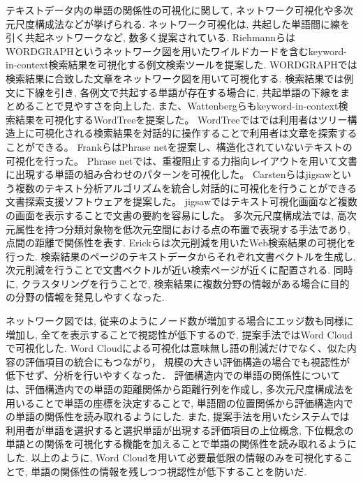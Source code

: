 \documentclass[syuuron]{kuee}
\begin{document}
		テキストデータ内の単語の関係性の可視化に関して, ネットワーク可視化や多次元尺度構成法などが挙げられる. 
		ネットワーク可視化は, 共起した単語間に線を引く共起ネットワークなど, 数多く提案されている. 
		RiehmannらはWORDGRAPHというネットワーク図を用いたワイルドカードを含むkeyword-in-context検索結果を可視化する例文検索ツールを提案した\cite{wg1}. 
		WORDGRAPHでは検索結果に合致した文章をネットワーク図を用いて可視化する. 
		検索結果では例文に下線を引き, 各例文で共起する単語が存在する場合に, 共起単語の下線をまとめることで見やすさを向上した. 
		また、Wattenbergらもkeyword-in-context検索結果を可視化するWordTreeを提案した\cite{wt1}。
		WordTreeではでは利用者はツリー構造上に可視化される検索結果を対話的に操作することで利用者は文章を探索することができる。
		FrankらはPhrase netを提案し、構造化されていないテキストの可視化を行った\cite{pn1}。
		Phrase netでは、重複阻止する力指向レイアウトを用いて文書に出現する単語の組み合わせのパターンを可視化した。
		Carstenらはjigsawという複数のテキスト分析アルゴリズムを統合し対話的に可視化を行うことができる文書探索支援ソフトウェアを提案した\cite{jig1}。
		jigsawではテキスト可視化画面など複数の画面を表示することで文書の要約を容易にした。
		多次元尺度構成法では, 高次元属性を持つ分類対象物を低次元空間における点の布置で表現する手法であり, 点間の距離で関係性を表す. 
		Erickらは次元削減を用いたWeb検索結果の可視化を行った\cite{or1}. 
		検索結果のページのテキストデータからそれぞれ文書ベクトルを生成し, 次元削減を行うことで文書ベクトルが近い検索ページが近くに配置される. 
		同時に, クラスタリングを行うことで, 検索結果に複数分野の情報がある場合に目的の分野の情報を発見しやすくなった. 
		
		ネットワーク図では, 従来のようにノード数が増加する場合にエッジ数も同様に増加し, 全てを表示することで視認性が低下するので, 
		提案手法ではWord Cloudで可視化した. 
		Word Cloudによる可視化は意味無し語の削減だけでなく、似た内容の評価項目の統合にもつながり，
		規模の大きい評価構造の場合でも視認性が低下せず、分析を行いやすくなった．
		評価構造内での単語の関係性については、評価構造内での単語の距離関係から距離行列を作成し, 
		多次元尺度構成法を用いることで単語の座標を決定することで, 単語間の位置関係から評価構造内での単語の関係性を読み取れるようにした. 
		また, 提案手法を用いたシステムでは利用者が単語を選択すると選択単語が出現する評価項目の上位概念, 
		下位概念の単語との関係を可視化する機能を加えることで単語の関係性を読み取れるようにした.
		以上のように, Word Cloudを用いて必要最低限の情報のみを可視化することで, 単語の関係性の情報を残しつつ視認性が低下することを防いだ. 
		
\end{document}
